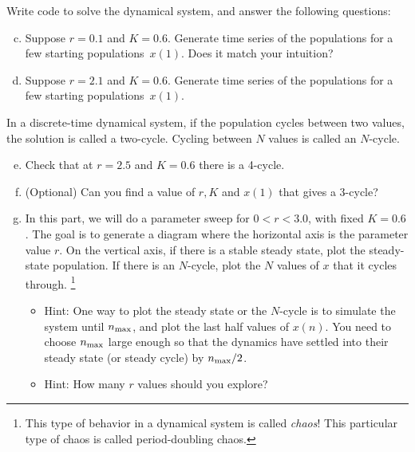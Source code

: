 \documentclass{exam}
\begin{document}
Write code to solve the dynamical system, and answer the following questions:
\begin{enumerate}[a.]
\setcounter{enumi}{2}
\item Suppose $r=0.1$ and $K=0.6$. Generate time series of the populations for a few starting populations~$x(1)$. Does it match your intuition?
\item Suppose $r=2.1$ and $K=0.6$. Generate time series of the populations for a few starting populations~$x(1)$. 
\end{enumerate}
In a discrete-time dynamical system, if the population cycles between two values, the solution is called a two-cycle. Cycling between $N$ values is called an $N$-cycle. 
\begin{enumerate}[a.]
\setcounter{enumi}{4}
\item Check that at $r=2.5$ and $K=0.6$ there is a 4-cycle. 
\item (Optional) Can you find a value of $r,K$ and $x(1)$ that gives a 3-cycle?
\item In this part, we will do a parameter sweep for $0<r<3.0$, with fixed $K=0.6$. The goal is to generate a diagram where the horizontal axis is the parameter value $r$. On the vertical axis, if there is a stable steady state, plot the steady-state population. If there is an $N$-cycle, plot the $N$ values of $x$ that it cycles through. \footnote{This type of behavior in a dynamical system is called \emph{chaos}! This particular type of chaos is called period-doubling chaos.}
\begin{itemize}
\item Hint: One way to plot the steady state or the $N$-cycle is to simulate the system until $n_{\rm max}$, and plot the last half values of $x(n)$. You need to choose $n_{\rm max}$ large enough so that the dynamics have settled into their steady state (or steady cycle) by $n_{\rm max}/2$.
\item Hint: How many $r$ values should you explore? 
\end{itemize}
\end{enumerate}

  
\end{document}
